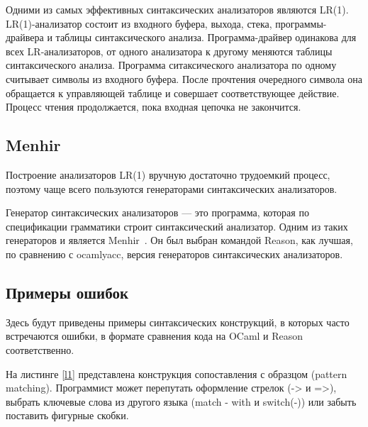 Одними из самых эффективных синтаксических анализаторов являются LR(1)\cite{LRSpeed}. LR(1)-анализатор состоит из входного буфера, выхода, стека, программы-драйвера и таблицы синтаксического анализа. Программа-драйвер одинакова для всех LR-анализаторов, от одного анализатора к другому меняются таблицы синтаксического анализа. Программа ситаксического анализатора по одному считывает символы из входного буфера. После прочтения очередного символа она обращается к управляющей таблице и совершает соответствующее действие. Процесс чтения продолжается, пока входная цепочка не закончится.

\subsection{Menhir}
Построение анализаторов LR(1) вручную достаточно трудоемкий процесс, поэтому чаще всего пользуются генераторами синтаксических анализаторов. 

Генератор синтаксических анализаторов --- это программа, которая по спецификации грамматики строит синтаксический анализатор. Одним из таких генераторов и является Menhir~\cite{ME}. Он был выбран командой Reason, как лучшая, по сравнению с ocamlyacc, версия генераторов синтаксических анализаторов.



\subsection{Примеры ошибок}

Здесь будут приведены примеры синтаксических конструкций, в которых часто встречаются ошибки, в формате сравнения кода на OCaml и Reason соответственно.

\hfill


\begin{example}
	\begin{subexample}[b]{\textwidth}
		
		\caption{}
	\end{subexample}
	\hfill
	
	\begin{subexample}[b]{\textwidth}
		
		\caption{}
	\end{subexample}
\caption{}\label{l1}
\end{example}

На листинге \ref{l1} представлена конструкция сопоставления с образцом (pattern matching). Программист может перепутать оформление стрелок (-> и =>), выбрать ключевые слова из другого языка (match - with и switch(-)) или забыть поставить фигурные скобки.


